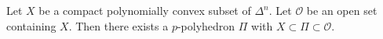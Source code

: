 
Let $X$ be a compact polynomially convex subset of $\Delta^n$. Let $\mathcal{O}$ be an open set containing $X$. Then there exists a $p$-polyhedron $\Pi$ with $X \subset \Pi \subset \mathcal{O}$.
